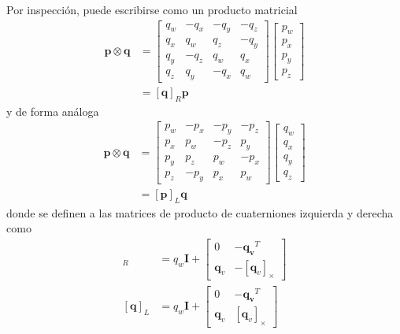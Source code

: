 Por inspección, puede escribirse como un producto matricial
\begin{align}
    \bm{p}\otimes\bm{q} &= 
    \begin{bmatrix}
        q_w & -q_x & -q_y & -q_z \\
        q_x & q_w & q_z & -q_y \\
        q_y & -q_z & q_w & q_x \\
        q_z & q_y & -q_x & q_w
    \end{bmatrix}
    \begin{bmatrix}
        p_w \\
        p_x \\
        p_y \\
        p_z
    \end{bmatrix}
    \\
    &= 
    [\bm{q}]_R \bm{p}
    \label{eq:quaternionproductright}
\end{align}
y de forma análoga
\begin{align}
    \bm{p}\otimes\bm{q} &= 
    \begin{bmatrix}
        p_w & -p_x & -p_y & -p_z \\
        p_x & p_w & -p_z & p_y \\
        p_y & p_z & p_w & -p_x \\
        p_z & -p_y & p_x & p_w
    \end{bmatrix}
    \begin{bmatrix}
        q_w \\
        q_x \\
        q_y \\
        q_z
    \end{bmatrix}
    \\
    &= [\bm{p}]_L\bm{q}
    \label{eq:quaternionproductleft}
\end{align}
donde se definen a las matrices de producto de cuaterniones izquierda y derecha como
\begin{align}
    [\bm{q}]_R &= q_w\bm{I} +
    \begin{bmatrix}
        0 & -\bm{q_v}^T \\
        \bm{q}_v & -[\bm{q}_v]_\times
    \end{bmatrix}
    \label{eq:quaternionproductmatrixright}
    \\
    [\bm{q}]_L &= q_w\bm{I} +
    \begin{bmatrix}
        0 & -\bm{q_v}^T \\
        \bm{q}_v & [\bm{q}_v]_\times
    \end{bmatrix}
    \label{eq:quaternionproductmatrixleft}
\end{align}

